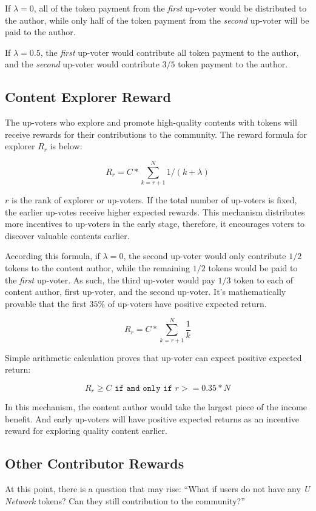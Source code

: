 If $\lambda = 0$, all of the token payment from the \emph{first} up-voter would be distributed to the author, while only half of the token payment from the \emph{second} up-voter will be paid to the author. 

If $\lambda = 0.5$, the \emph{first} up-voter would contribute all token payment to the author, and the \emph{second} up-voter would contribute $3/5$ token payment to the author. 


\subsection{Content Explorer Reward}
The up-voters who explore and promote high-quality contents with tokens will receive rewards for their contributions to the community. The reward formula for explorer $R_r$ is below:
\begin{center}
$$R_r = C * \sum_{k=r+1}^{N} 1/{(k + \lambda)}$$
\end{center}
$r$ is the rank of explorer or up-voters. If the total number of up-voters is fixed, the earlier up-votes receive higher expected rewards. This mechanism distributes more incentives to up-voters in the early stage, therefore, it encourages voters to discover valuable contents earlier.
 
According this formula, if $\lambda = 0$, the second up-voter would only contribute $1/2$ tokens to the content author, while the remaining $1/2$ tokens would be paid to the \emph{first} up-voter. As such, the third up-voter would pay $1/3$ token to each of content author, first up-voter, and the second up-voter. It's mathematically provable that the first $35\%$ of up-voters have positive expected return.     
\begin{center}
$$R_r = C * \sum_{k=r+1}^{N} \frac{1}{k}$$ 
\end{center}
Simple arithmetic calculation proves that up-voter can expect positive expected return:
\begin{center}
$$R_r \geq C \texttt{ if and only if } {r}>=0.35*{N} $$
\end{center}
In this mechanism, the content author would take the largest piece of the income benefit. And early up-voters will have positive expected returns as an incentive reward for exploring quality content earlier. 


\subsection{Other Contributor Rewards}
At this point, there is a question that may rise: ``What if users do not have any \emph{U Network}  tokens? Can they still contribution to the community?''

